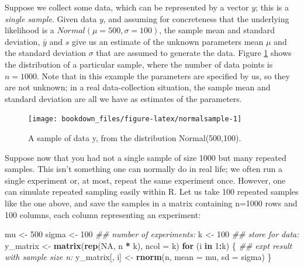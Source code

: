 \documentclass[12pt,]{krantz}
\newenvironment{Shaded}{\begin{snugshade}}{\end{snugshade}}
\newcommand{\CommentTok}[1]{\textcolor[rgb]{0.56,0.35,0.01}{\textit{#1}}}
\newcommand{\ControlFlowTok}[1]{\textcolor[rgb]{0.13,0.29,0.53}{\textbf{#1}}}
\newcommand{\DataTypeTok}[1]{\textcolor[rgb]{0.13,0.29,0.53}{#1}}
\newcommand{\DecValTok}[1]{\textcolor[rgb]{0.00,0.00,0.81}{#1}}
\newcommand{\KeywordTok}[1]{\textcolor[rgb]{0.13,0.29,0.53}{\textbf{#1}}}
\newcommand{\NormalTok}[1]{#1}
\newcommand{\OperatorTok}[1]{\textcolor[rgb]{0.81,0.36,0.00}{\textbf{#1}}}
\newcommand{\OtherTok}[1]{\textcolor[rgb]{0.56,0.35,0.01}{#1}}
\newcommand{\StringTok}[1]{\textcolor[rgb]{0.31,0.60,0.02}{#1}}
\begin{document}
Suppose we collect some data, which can be represented by a vector \(y\); this is a \emph{single sample}. Given data \(y\), and assuming for concreteness that the underlying likelihood is a \(Normal(\mu=500,\sigma=100)\), the sample mean and standard deviation, \(\bar{y}\) and \(s\) give us an estimate of the unknown parameters mean \(\mu\) and the standard deviation \(\sigma\) that are assumed to generate the data. Figure \ref{fig:normalsample} shows the distribution of a particular sample, where the number of data points is \(n=1000\). Note that in this example the parameters are specified by us, so they are not unknown; in a real data-collection situation, the sample mean and standard deviation are all we have as estimates of the parameters.

\begin{figure}
\texttt{[image: bookdown\_files/figure-latex/normalsample-1]} \caption{A sample of data y, from the distribution  Normal(500,100).}\label{fig:normalsample}
\end{figure}

Suppose now that you had not a single sample of size 1000 but many repeated samples. This isn't something one can normally do in real life; we often run a single experiment or, at most, repeat the same experiment once. However, one can simulate repeated sampling easily within R. Let us take 100 repeated samples like the one above, and save the samples in a matrix containing n=1000 rows and 100 columns, each column representing an experiment:

\begin{Shaded}
\begin{Highlighting}[]
\NormalTok{mu <-}\StringTok{ }\DecValTok{500}
\NormalTok{sigma <-}\StringTok{ }\DecValTok{100}
\CommentTok{## number of experiments:}
\NormalTok{k <-}\StringTok{ }\DecValTok{100}
\CommentTok{## store for data:}
\NormalTok{y_matrix <-}\StringTok{ }\KeywordTok{matrix}\NormalTok{(}\KeywordTok{rep}\NormalTok{(}\OtherTok{NA}\NormalTok{, n }\OperatorTok{*}\StringTok{ }\NormalTok{k), }\DataTypeTok{ncol =}\NormalTok{ k)}
\ControlFlowTok{for}\NormalTok{ (i }\ControlFlowTok{in} \DecValTok{1}\OperatorTok{:}\NormalTok{k) \{}
  \CommentTok{## expt result with sample size n:}
\NormalTok{  y_matrix[, i] <-}\StringTok{ }\KeywordTok{rnorm}\NormalTok{(n, }\DataTypeTok{mean =}\NormalTok{ mu, }
    \DataTypeTok{sd =}\NormalTok{ sigma)}
\NormalTok{\}}
\end{Highlighting}
\end{Shaded}
\end{document}
